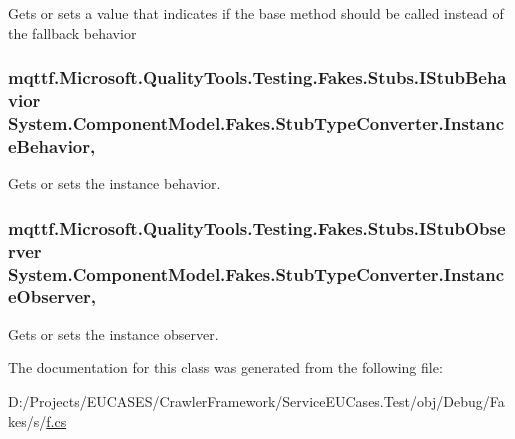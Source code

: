 Gets or sets a value that indicates if the base method should be called instead of the fallback behavior

\hypertarget{class_system_1_1_component_model_1_1_fakes_1_1_stub_type_converter_a7fcc33062606d567ff82f9735a570578}{
\subsubsection[{Instance\-Behavior}]{\setlength{\rightskip}{0pt plus 5cm}mqttf.\-Microsoft.\-Quality\-Tools.\-Testing.\-Fakes.\-Stubs.\-I\-Stub\-Behavior System.\-Component\-Model.\-Fakes.\-Stub\-Type\-Converter.\-Instance\-Behavior\hspace{0.3cm}{\ttfamily [get]}, {\ttfamily [set]}}}\label{class_system_1_1_component_model_1_1_fakes_1_1_stub_type_converter_a7fcc33062606d567ff82f9735a570578}


Gets or sets the instance behavior.

\hypertarget{class_system_1_1_component_model_1_1_fakes_1_1_stub_type_converter_a7ed846151312c7353aa056bed462d27f}{
\subsubsection[{Instance\-Observer}]{\setlength{\rightskip}{0pt plus 5cm}mqttf.\-Microsoft.\-Quality\-Tools.\-Testing.\-Fakes.\-Stubs.\-I\-Stub\-Observer System.\-Component\-Model.\-Fakes.\-Stub\-Type\-Converter.\-Instance\-Observer\hspace{0.3cm}{\ttfamily [get]}, {\ttfamily [set]}}}\label{class_system_1_1_component_model_1_1_fakes_1_1_stub_type_converter_a7ed846151312c7353aa056bed462d27f}


Gets or sets the instance observer.



The documentation for this class was generated from the following file\-:\begin{DoxyCompactItemize}
\item 
D\-:/\-Projects/\-E\-U\-C\-A\-S\-E\-S/\-Crawler\-Framework/\-Service\-E\-U\-Cases.\-Test/obj/\-Debug/\-Fakes/s/\hyperlink{s_2f_8cs}{f.\-cs}\end{DoxyCompactItemize}
